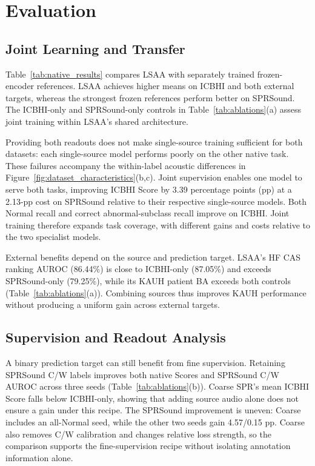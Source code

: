 \begingroup
\setlength{\emergencystretch}{1.5em}
\section{Evaluation}
\label{sec:evaluation}

\subsection{Joint Learning and Transfer}
\label{sec:protocol}
\label{sec:native_results}
Table~\ref{tab:native_results} compares LSAA with separately trained
frozen-encoder references. LSAA achieves higher means on ICBHI and both
external targets, whereas the strongest frozen references perform better
on SPRSound. The ICBHI-only and SPRSound-only controls in
Table~\ref{tab:ablations}(a) assess joint training within LSAA's shared
architecture.

\LSAAMainResultsTable

Providing both readouts does not make single-source training sufficient
for both datasets: each single-source model performs poorly on the other
native task. These failures accompany the within-label acoustic differences
in Figure~\ref{fig:dataset_characteristics}(b,c).
Joint supervision enables one model to serve both tasks, improving ICBHI
Score by 3.39 percentage points (pp) at a 2.13-pp cost on SPRSound relative
to their respective single-source models. Both Normal recall and correct
abnormal-subclass recall improve on ICBHI. Joint training therefore
expands task coverage, with different gains and costs relative to the
two specialist models.

External benefits depend on the source and prediction target.
LSAA's HF CAS ranking AUROC (86.44\%) is close to ICBHI-only (87.05\%)
and exceeds SPRSound-only (79.25\%), while its KAUH patient BA exceeds
both controls (Table~\ref{tab:ablations}(a)). Combining sources thus improves
KAUH performance without producing a uniform gain across external targets.

\subsection{Supervision and Readout Analysis}
\label{sec:ablations}
\label{sec:fine_supervision}
\label{sec:readout_analysis}
\label{sec:transfer}
A binary prediction target can still benefit from fine supervision.
Retaining SPRSound C/W labels improves both native Scores and SPRSound
C/W AUROC across three seeds (Table~\ref{tab:ablations}(b)). Coarse SPR's
mean ICBHI Score falls below ICBHI-only, showing that adding source audio
alone does not ensure a gain under this recipe. The SPRSound improvement
is uneven: Coarse includes an all-Normal seed, while the other two seeds
gain 4.57/0.15 pp. Coarse also removes C/W calibration and changes relative
loss strength, so the comparison supports the fine-supervision recipe
without isolating annotation information alone.

